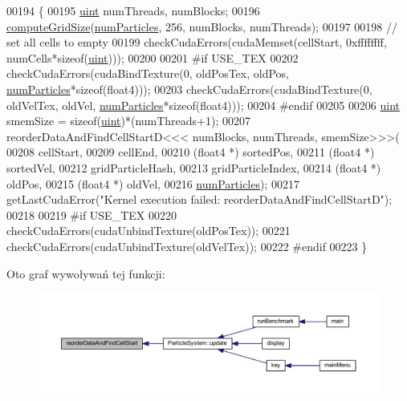 \begin{DoxyCode}
00194     \{
00195         \hyperlink{particles__kernel_8cuh_a91ad9478d81a7aaf2593e8d9c3d06a14}{uint} numThreads, numBlocks;
00196         \hyperlink{particle_system__cuda_8cu_a78e8aa50e0629b57cff219a2fa753ed0}{computeGridSize}(\hyperlink{particles_8cpp_a05b8a90212054a3eb1a036ae0c269596}{numParticles}, 256, numBlocks, numThreads);
00197 
00198         \textcolor{comment}{// set all cells to empty}
00199         checkCudaErrors(cudaMemset(cellStart, 0xffffffff, numCells*\textcolor{keyword}{sizeof}(\hyperlink{particles__kernel_8cuh_a91ad9478d81a7aaf2593e8d9c3d06a14}{uint})));
00200 
00201 \textcolor{preprocessor}{#if USE\_TEX}
00202 \textcolor{preprocessor}{}        checkCudaErrors(cudaBindTexture(0, oldPosTex, oldPos, \hyperlink{particles_8cpp_a05b8a90212054a3eb1a036ae0c269596}{numParticles}*\textcolor{keyword}{sizeof}(float4)));
00203         checkCudaErrors(cudaBindTexture(0, oldVelTex, oldVel, \hyperlink{particles_8cpp_a05b8a90212054a3eb1a036ae0c269596}{numParticles}*\textcolor{keyword}{sizeof}(float4)));
00204 \textcolor{preprocessor}{#endif}
00205 \textcolor{preprocessor}{}
00206         \hyperlink{particles__kernel_8cuh_a91ad9478d81a7aaf2593e8d9c3d06a14}{uint} smemSize = \textcolor{keyword}{sizeof}(\hyperlink{particles__kernel_8cuh_a91ad9478d81a7aaf2593e8d9c3d06a14}{uint})*(numThreads+1);
00207         reorderDataAndFindCellStartD<<< numBlocks, numThreads, smemSize>>>(
00208             cellStart,
00209             cellEnd,
00210             (float4 *) sortedPos,
00211             (float4 *) sortedVel,
00212             gridParticleHash,
00213             gridParticleIndex,
00214             (float4 *) oldPos,
00215             (float4 *) oldVel,
00216             \hyperlink{particles_8cpp_a05b8a90212054a3eb1a036ae0c269596}{numParticles});
00217         getLastCudaError(\textcolor{stringliteral}{"Kernel execution failed: reorderDataAndFindCellStartD"});
00218 
00219 \textcolor{preprocessor}{#if USE\_TEX}
00220 \textcolor{preprocessor}{}        checkCudaErrors(cudaUnbindTexture(oldPosTex));
00221         checkCudaErrors(cudaUnbindTexture(oldVelTex));
00222 \textcolor{preprocessor}{#endif}
00223 \textcolor{preprocessor}{}    \}
\end{DoxyCode}


Oto graf wywoływań tej funkcji\-:\nopagebreak
\begin{figure}[H]
\begin{center}
\leavevmode
\includegraphics[width=350pt]{particle_system_8cuh_ac72ccd068434c46c2f901c751d53be1d_icgraph}
\end{center}
\end{figure}


